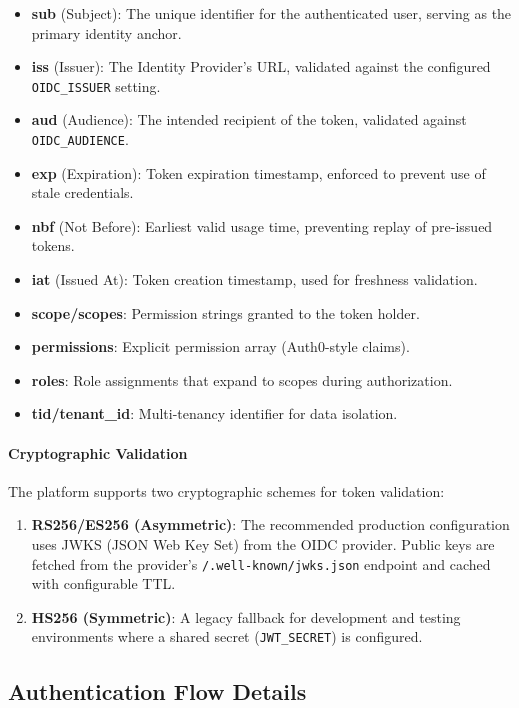 \begin{itemize}
    \item \textbf{sub} (Subject): The unique identifier for the authenticated user, serving as the primary identity anchor.
    \item \textbf{iss} (Issuer): The Identity Provider's URL, validated against the configured \texttt{OIDC\_ISSUER} setting.
    \item \textbf{aud} (Audience): The intended recipient of the token, validated against \texttt{OIDC\_AUDIENCE}.
    \item \textbf{exp} (Expiration): Token expiration timestamp, enforced to prevent use of stale credentials.
    \item \textbf{nbf} (Not Before): Earliest valid usage time, preventing replay of pre-issued tokens.
    \item \textbf{iat} (Issued At): Token creation timestamp, used for freshness validation.
    \item \textbf{scope/scopes}: Permission strings granted to the token holder.
    \item \textbf{permissions}: Explicit permission array (Auth0-style claims).
    \item \textbf{roles}: Role assignments that expand to scopes during authorization.
    \item \textbf{tid/tenant\_id}: Multi-tenancy identifier for data isolation.
\end{itemize}

\paragraph{Cryptographic Validation}
The platform supports two cryptographic schemes for token validation:

\begin{enumerate}
    \item \textbf{RS256/ES256 (Asymmetric)}: The recommended production configuration uses JWKS (JSON Web Key Set) from the OIDC provider. Public keys are fetched from the provider's \texttt{/.well-known/jwks.json} endpoint and cached with configurable TTL.
    \item \textbf{HS256 (Symmetric)}: A legacy fallback for development and testing environments where a shared secret (\texttt{JWT\_SECRET}) is configured.
\end{enumerate}

\subsection{Authentication Flow Details}
\label{subsec:auth-flow-details}

